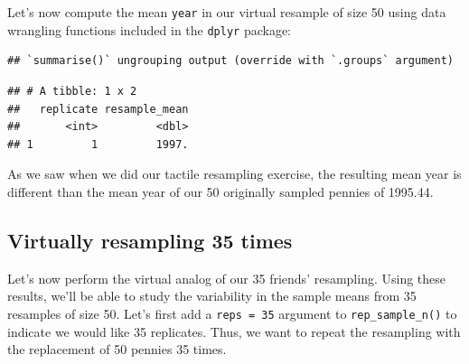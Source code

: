 \documentclass[
]{book}
\newenvironment{Shaded}{\begin{snugshade}}{\end{snugshade}}
\newcommand{\DataTypeTok}[1]{\textcolor[rgb]{0.13,0.29,0.53}{#1}}
\newcommand{\DecValTok}[1]{\textcolor[rgb]{0.00,0.00,0.81}{#1}}
\newcommand{\KeywordTok}[1]{\textcolor[rgb]{0.13,0.29,0.53}{\textbf{#1}}}
\newcommand{\NormalTok}[1]{#1}
\newcommand{\OperatorTok}[1]{\textcolor[rgb]{0.81,0.36,0.00}{\textbf{#1}}}
\newcommand{\OtherTok}[1]{\textcolor[rgb]{0.56,0.35,0.01}{#1}}
\newcommand{\StringTok}[1]{\textcolor[rgb]{0.31,0.60,0.02}{#1}}
\begin{document}
Let's now compute the mean \texttt{year} in our virtual resample of size 50 using data wrangling functions included in the \texttt{dplyr} package:

\begin{Shaded}
\end{Shaded}

\begin{verbatim}
## `summarise()` ungrouping output (override with `.groups` argument)
\end{verbatim}

\begin{verbatim}
## # A tibble: 1 x 2
##   replicate resample_mean
##       <int>         <dbl>
## 1         1         1997.
\end{verbatim}

As we saw when we did our tactile resampling exercise, the resulting mean year is different than the mean year of our 50 originally sampled pennies of 1995.44.

\hypertarget{bootstrap-35-replicates}{%
\subsection{Virtually resampling 35 times}\label{bootstrap-35-replicates}}

Let's now perform the virtual analog of our 35 friends' resampling. Using these results, we'll be able to study the variability in the sample means from 35 resamples of size 50. Let's first add a \texttt{reps\ =\ 35} argument to \texttt{rep\_sample\_n()}  to indicate we would like 35 replicates. Thus, we want to repeat the resampling with the replacement of 50 pennies 35 times.

\begin{Shaded}
\end{Shaded}
\end{document}
